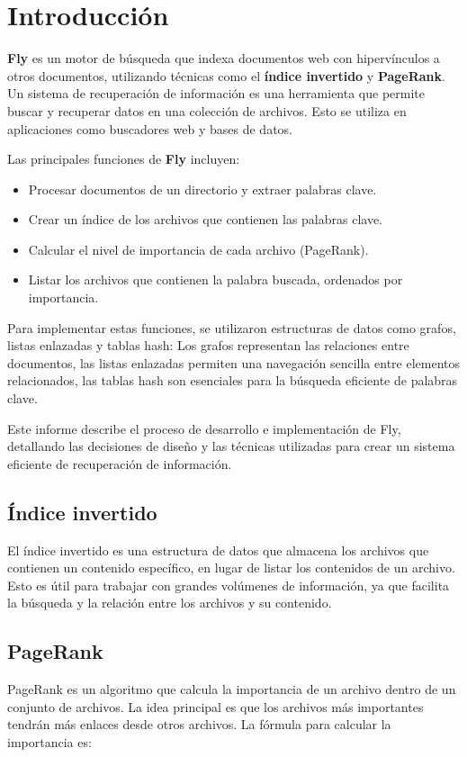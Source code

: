 \section{Introducción}
\rhostart{}

\textbf{Fly} es un motor de búsqueda que indexa documentos web con hipervínculos a otros documentos, utilizando técnicas como el \textbf{índice invertido} y \textbf{PageRank}. Un sistema de recuperación de información es una herramienta que permite buscar y recuperar datos en una colección de archivos. Esto se utiliza en aplicaciones como buscadores web y bases de datos.

Las principales funciones de \textbf{Fly} incluyen:
\begin{itemize}
\item Procesar documentos de un directorio y extraer palabras clave.
\item Crear un índice de los archivos que contienen las palabras clave.
\item Calcular el nivel de importancia de cada archivo (PageRank).
\item Listar los archivos que contienen la palabra buscada, ordenados por importancia.
\end{itemize}

Para implementar estas funciones, se utilizaron estructuras de datos como grafos, listas enlazadas y tablas hash: Los grafos representan las relaciones entre documentos, las listas enlazadas permiten una navegación sencilla entre elementos relacionados, las tablas hash son esenciales para la búsqueda eficiente de palabras clave.

Este informe describe el proceso de desarrollo e implementación de Fly, detallando las decisiones de diseño y las técnicas utilizadas para crear un sistema eficiente de recuperación de información.

\subsection{Índice invertido}
El índice invertido es una estructura de datos que almacena los archivos que contienen un contenido específico, en lugar de listar los contenidos de un archivo. Esto es útil para trabajar con grandes volúmenes de información, ya que facilita la búsqueda y la relación entre los archivos y su contenido.

\subsection{PageRank}
PageRank es un algoritmo que calcula la importancia de un archivo dentro de un conjunto de archivos. La idea principal es que los archivos más importantes tendrán más enlaces desde otros archivos. La fórmula para calcular la importancia es:

